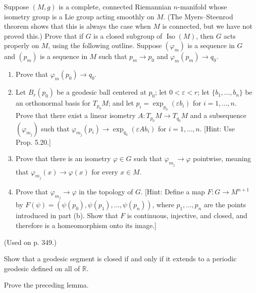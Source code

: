 \begin{exercise}
\label{prob:isometry-group-acts-properly}

Suppose $(M, g)$ is a complete, connected Riemannian $n$-manifold whose isometry group is a Lie group acting smoothly on $M$. (The Myers--Steenrod theorem shows that this is always the case when $M$ is connected, but we have not proved this.) Prove that if $G$ is a closed subgroup of $\operatorname{Iso}(M)$, then $G$ acts properly on $M$, using the following outline. Suppose $(\varphi_m)$ is a sequence in $G$ and $(p_m)$ is a sequence in $M$ such that $p_m \to p_0$ and $\varphi_m(p_m) \to q_0$.
\begin{enumerate}
\item[(a)] Prove that $\varphi_m(p_0) \to q_0$.
\item[(b)] Let $B_r(p_0)$ be a geodesic ball centered at $p_0$; let $0 < \varepsilon < r$; let $\{b_1, \ldots, b_n\}$ be an orthonormal basis for $T_{p_0}M$; and let $p_i = \exp_{p_0}(\varepsilon b_i)$ for $i = 1, \ldots, n$. Prove that there exist a linear isometry $A : T_{p_0}M \to T_{q_0}M$ and a subsequence $(\varphi_{m_j})$ such that $\varphi_{m_j}(p_i) \to \exp_{q_0}(\varepsilon A b_i)$ for $i = 1, \ldots, n$. [Hint: Use Prop. 5.20.]
\item[(c)] Prove that there is an isometry $\varphi \in G$ such that $\varphi_{m_j} \to \varphi$ pointwise, meaning that $\varphi_{m_j}(x) \to \varphi(x)$ for every $x \in M$.
\item[(d)] Prove that $\varphi_{m_j} \to \varphi$ in the topology of $G$. [Hint: Define a map $F: G \to M^{n+1}$ by $F(\psi) = (\psi(p_0), \psi(p_1), \ldots, \psi(p_n))$, where $p_1, \ldots, p_n$ are the points introduced in part (b). Show that $F$ is continuous, injective, and closed, and therefore is a homeomorphism onto its image.]
\end{enumerate}
(Used on p. 349.)
\end{exercise}


\begin{exercise}
\label{exer:closed-geodesic-periodic-extension}

Show that a geodesic segment is closed if and only if it extends to a periodic geodesic defined on all of $\mathbb{R}$.
\end{exercise}

\begin{exercise}
\label{exer:prove-distance-lemma}

Prove the preceding lemma.
\end{exercise}

